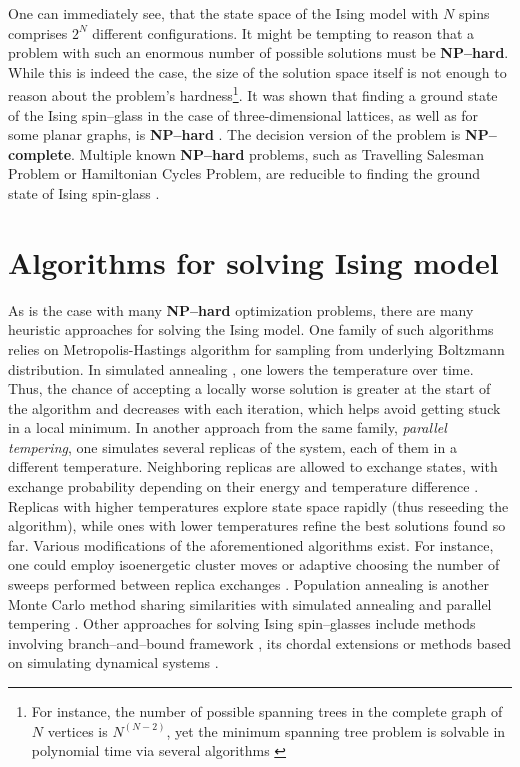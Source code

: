 One can immediately see, that the state space of the Ising model with $N$ spins comprises $2^{N}$
different configurations. It might be tempting to reason that a problem with such an enormous number
of possible solutions must be \textbf{NP--hard}. While this is indeed the case, the size of the
solution space itself is not enough to reason about the problem's hardness\footnote{For instance,
the number of possible spanning trees in the complete graph of $N$ vertices is $N^{(N-2)}$, yet the
minimum spanning tree problem is solvable in polynomial time via several algorithms \cite{clrs}}.
It was shown that finding a ground state of the Ising spin--glass in the case of three-dimensional
lattices, as well as for some planar graphs,  is \textbf{NP--hard} \cite{barahoma}. The decision
version of the problem is \textbf{NP--complete}. Multiple known \textbf{NP--hard} problems, such as
Travelling Salesman Problem or Hamiltonian Cycles Problem, are reducible to finding the ground state of Ising spin-glass \cite{lucas}.

\section{Algorithms for solving Ising model}

As is the case with many \textbf{NP--hard} optimization problems, there are many heuristic
approaches for solving the Ising model. One family of such algorithms relies on Metropolis-Hastings
\cite{beichl} algorithm for sampling from underlying Boltzmann distribution. In simulated annealing
\cite{cook, isakov}, one lowers the temperature over time. Thus, the chance of accepting a locally
worse solution is greater at the start of the algorithm and decreases with each iteration, which
helps avoid getting stuck in a local minimum. In another approach from the same family,
\emph{parallel tempering}, one simulates several replicas of the system, each of them in a different
temperature. Neighboring replicas are allowed to exchange states, with exchange probability
depending on their energy and temperature difference \cite{swendsen}. Replicas with higher
temperatures explore state space rapidly (thus reseeding the algorithm), while ones with lower
temperatures refine the best solutions found so far. Various modifications of the aforementioned
algorithms exist. For instance, one could employ isoenergetic cluster moves \cite{zhu} or adaptive
choosing the number of sweeps performed between replica exchanges \cite{bittner}. Population
annealing is another Monte Carlo method sharing similarities with simulated annealing and parallel
tempering \cite{wang}. Other approaches for solving Ising spin--glasses include methods involving
branch--and--bound framework \cite{rendl}, its chordal extensions \cite{baccari} or methods based on
simulating dynamical systems \cite{sheldon}.

